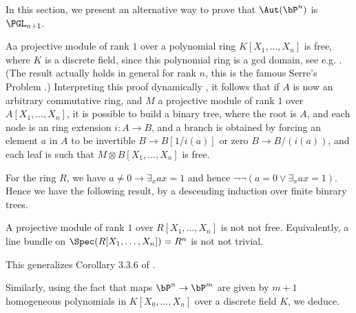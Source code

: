 In this section, we present an alternative way to prove that   $\Aut(\bP^n)$ is $\PGL_{n+1}$.

Aa projective module of rank $1$ over a polynomial
ring $K[X_1,\dots,X_n]$ is free, where $K$ is a discrete field, since this polynomial ring is a gcd domain, see
e.g. \cite{seminormal}. (The result actually holds in general
for rank $n$, this is the famous Serre's Problem \cite{Lam}.) Interpreting this proof dynamically
\cite{lombardi-quitte}, it follows that if $A$ is now an arbitrary commutative ring, and $M$ a
projective module of rank $1$ over $A[X_1,\dots,X_n]$, it is possible to build a binary tree, where
the root is $A$, and each node is an ring extension $i:A\rightarrow B$, and a branch is obtained
by forcing an element $a$ in $A$ to be invertible $B\rightarrow B[1/i(a)]$ or zero $B\rightarrow B/(i(a))$,
and each leaf is such that $M\otimes B[X_1,\dots,X_n]$ is free.

For the ring $R$, we have $a\neq 0\rightarrow \exists_x ax=1$ and hence $\neg \neg (a=0\vee \exists_x a x=1)$.
Hence we have the following result, by a descending induction over finite binrary trees.

\begin{lemma}\label{notnot}
  A projective module of rank $1$ over $R[X_1,\dots,X_n]$ is not not free. Equivalently, 
a line bundle on $\Spec(R[X_1,\dots,X_n]) = R^n$ is not not trivial.
\end{lemma}

This generalizes Corollary 3.3.6 of \cite{draft}.



Similarly, using the fact that maps $\bP^n\rightarrow \bP^m$ are given by $m+1$ homogeneous polynomials in $K[X_0,\dots,X_n]$
over a discrete field $K$, we deduce.

